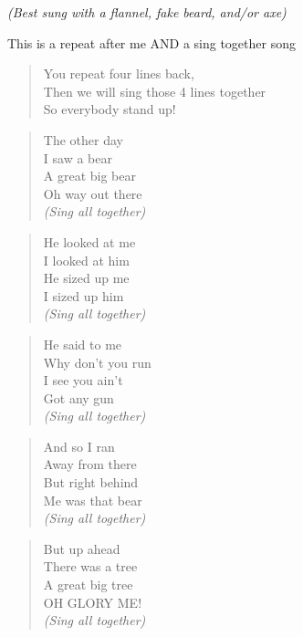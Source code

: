 
\textit{(Best sung with a flannel, fake beard, and/or axe)}

This is a repeat after me AND a sing together song

\begin{verse}
You repeat four lines back, \\
Then we will sing those 4 lines together \\
So everybody stand up! \\
\end{verse}

\begin{verse}
The other day \\
I saw a bear \\
A great big bear \\
Oh way out there \\
\textit{(Sing all together)} \\
\end{verse}

\begin{verse}
He looked at me \\
I looked at him \\
He sized up me \\
I sized up him \\
\textit{(Sing all together)} \\
\end{verse}

\begin{verse}
He said to me \\
Why don't you run \\
I see you ain't \\
Got any gun \\
\textit{(Sing all together)} \\
\end{verse}

\begin{verse}
And so I ran \\
Away from there \\
But right behind \\
Me was that bear \\
\textit{(Sing all together)} \\
\end{verse}

\begin{verse}
But up ahead \\
There was a tree \\
A great big tree \\
OH GLORY ME! \\
\textit{(Sing all together)} \\
\end{verse}

